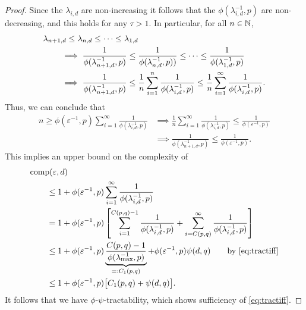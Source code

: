 \documentclass[11pt,a4paper]{article}
\begin{document}
\begin{proof}
Since the $\lambda_{i,d}$ are non-increasing it follows that the $\phi(\lambda_{i, d}^{-1},p)$ are non-decreasing, and this holds for any $\tau>1$.  
In particular, for all $n \in \mathbb{N}$,
\begin{align*}
    \MoveEqLeft{\lambda_{n+1,d} \le \lambda_{n,d} \le \cdots \le \lambda_{1,d}} \\
    & \implies \frac{1}{\phi(\lambda_{n+1, d}^{-1},p)} \le \frac{1}{\phi(\lambda_{n, d}^{-1},p))} \le \cdots \le \frac{1}{\phi(\lambda_{1, d}^{-1},p)} \\
    & \implies \frac{1}{\phi(\lambda_{n+1, d}^{-1},p)} 
    \le \frac 1n \sum_{i=1}^n  \frac{1}{\phi(\lambda_{i, d}^{-1},p)} 
    \le \frac 1n \sum_{i=1}^\infty  \frac{1}{\phi(\lambda_{i, d}^{-1},p)}.
\end{align*}
Thus, we can conclude that 
\begin{align*}
    n \ge \phi(\varepsilon^{-1},p) \sum_{i=1}^\infty \frac{1}{\phi(\lambda_{i, d}^{-1},p)}
    & \implies 
  \frac 1n \sum_{i=1}^\infty \frac{1}{\phi(\lambda_{i, d}^{-1},p)} \le  \frac{1}{\phi(\varepsilon^{-1},p)} \\
   & \implies   \frac{1}{\phi(\lambda_{n+1, d}^{-1},p)} \le \frac{1}{\phi(\varepsilon^{-1},p)}.
\end{align*}
This implies an upper bound on the complexity of
\begin{align*}
       \MoveEqLeft{\comp(\varepsilon,d)} \\
       &\le 1 + \phi(\varepsilon^{-1},p) \sum_{i=1}^\infty \frac{1}{\phi(\lambda_{i, d}^{-1},p)} \\       
       & = 1 + \phi(\varepsilon^{-1},p) \left [ \sum_{i=1}^{C(p,q)-1} \frac{1}{\phi(\lambda_{i, d}^{-1},p)}  
       + \sum_{i=C(p,q)}^\infty \frac{1}{\phi(\lambda_{i, d}^{-1},p)} \right ] \\
       & \le 1+ \phi(\varepsilon^{-1},p) \underbrace{\frac{C(p,q)-1}{\phi(\lambda_{\max}^{-1},p)}}_{=:C_1(p,q)}
       +  \phi(\varepsilon^{-1},p) \psi(d,q)
        \qquad \text{by \eqref{eq:tractiff}} \\
        & \le 1+\phi(\varepsilon^{-1},p) \bigl[C_1(p,q) + \psi(d,q) \bigr].
\end{align*}
It follows that we have $\phi$-$\psi$-tractability, which shows sufficiency of \eqref{eq:tractiff}. 


\bigskip



\end{proof}
\end{document}

